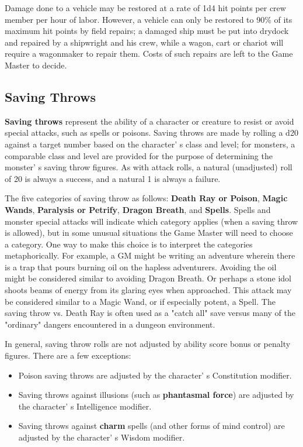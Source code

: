 \documentclass[a4paper,twoside,openany,10pt]{book}
\begin{document}
\begin{multicols}{2}
Damage done to a vehicle may be restored at a rate of 1d4 hit points per crew member per hour of labor. However, a vehicle can only be restored to 90\% of its maximum hit points by field repairs; a damaged ship must be put into drydock and repaired by a shipwright and his crew, while a wagon, cart or chariot will require a wagonmaker to repair them. Costs of such repairs are left to the Game Master to decide.

\subsection{Saving Throws}\label{saving-throws}

\textbf{Saving throws} represent the ability of a character or creature to resist or avoid special attacks, such as spells or poisons. Saving throws are made by rolling a d20 against a target number based on the character' s class and level; for monsters, a comparable class and level are provided for the purpose of determining the monster' s saving throw figures. As with attack rolls, a natural (unadjusted) roll of 20 is always a success, and a natural 1 is always a failure.

The five categories of saving throw as follows: \textbf{Death Ray or Poison}, \textbf{Magic Wands}, \textbf{Paralysis or Petrify}, \textbf{Dragon Breath}, and \textbf{Spells}. Spells and monster special attacks will indicate which category applies (when a saving throw is allowed), but in some unusual situations the Game Master will need to choose a category. One way to make this choice is to interpret the
categories metaphorically. For example, a GM might be writing an adventure wherein there is a trap that pours burning oil on the hapless adventurers. Avoiding the oil might be considered similar to avoiding Dragon Breath. Or perhaps a stone idol shoots beams of energy from its glaring eyes when approached. This attack may be considered similar to a Magic Wand, or if especially potent, a Spell. The saving throw vs. Death
Ray is often used as a "catch all" save versus many of the "ordinary" dangers encountered in a dungeon environment.

In general, saving throw rolls are not adjusted by ability score bonus or penalty figures. There are a few exceptions:

\begin{itemize}
\item
  Poison saving throws are adjusted by the character' s
  Constitution modifier.
\item
  Saving throws against illusions (such as \textbf{phantasmal force})
  are adjusted by the character' s Intelligence modifier.
\item
  Saving throws against \textbf{charm} spells (and other forms of mind
  control) are adjusted by the character' s Wisdom
  modifier.
\end{itemize}


\end{multicols}
\end{document}

